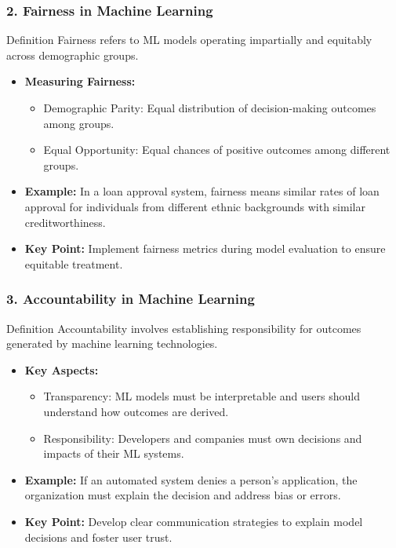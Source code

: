 \documentclass{beamer}
\begin{document}
\begin{frame}[fragile]
    \frametitle{2. Fairness in Machine Learning}
    \begin{block}{Definition}
        Fairness refers to ML models operating impartially and equitably across demographic groups.
    \end{block}

    \begin{itemize}
        \item \textbf{Measuring Fairness:}
        \begin{itemize}
            \item Demographic Parity: Equal distribution of decision-making outcomes among groups.
            \item Equal Opportunity: Equal chances of positive outcomes among different groups.
        \end{itemize}

        \item \textbf{Example:}
        In a loan approval system, fairness means similar rates of loan approval for individuals from different ethnic backgrounds with similar creditworthiness.

        \item \textbf{Key Point:}
        Implement fairness metrics during model evaluation to ensure equitable treatment.
    \end{itemize}
\end{frame}

\begin{frame}[fragile]
    \frametitle{3. Accountability in Machine Learning}
    \begin{block}{Definition}
        Accountability involves establishing responsibility for outcomes generated by machine learning technologies.
    \end{block}

    \begin{itemize}
        \item \textbf{Key Aspects:}
        \begin{itemize}
            \item Transparency: ML models must be interpretable and users should understand how outcomes are derived.
            \item Responsibility: Developers and companies must own decisions and impacts of their ML systems.
        \end{itemize}

        \item \textbf{Example:}
        If an automated system denies a person's application, the organization must explain the decision and address bias or errors.

        \item \textbf{Key Point:}
        Develop clear communication strategies to explain model decisions and foster user trust.
    \end{itemize}
\end{frame}
\end{document}
